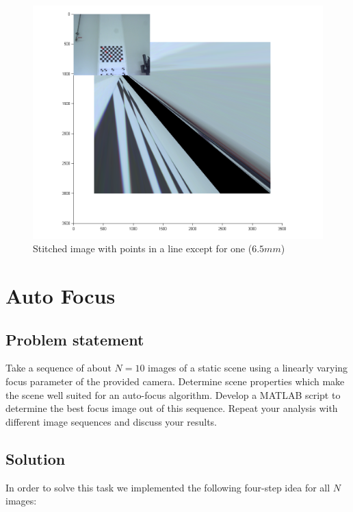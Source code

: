 \documentclass[
a4paper,     %
12pt         %
]{scrartcl}  %
\begin{document}
\begin{figure}[ht!]
 \centering
 \includegraphics[scale=0.4]{./Bildg_Messtechnik_Lab/PanoramaStitching/figb5.png}
 \caption{Stitched image with points in a line except for one ($6.5mm$)}
 \label{fig:lineareastitch}
\end{figure}

\pagebreak

\section{Auto Focus}

\subsection{Problem statement}

Take a sequence of about $N = 10$ images of a static scene using a linearly varying focus parameter of the
provided camera. Determine scene properties which make the scene well suited for an auto-focus algorithm.
Develop a MATLAB script to determine the best focus image out of this sequence. Repeat your analysis with
different image sequences and discuss your results.

\subsection{Solution}

In order to solve this task we implemented the following four-step idea for all $N$ images:
\end{document}
